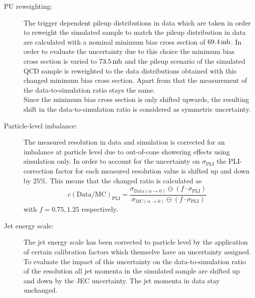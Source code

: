 \begin{description}
 \item[PU reweighting:] The trigger dependent pileup distributions in data which are taken in order to reweight the simulated sample to match the pileup distribution in data are calculated with a nominal minimum bias cross section of $69.4\,\rm{mb}$. In order to evaluate the uncertainty due to this choice the minimum bias cross section is varied to $73.5\,\rm{mb}$ and the pileup scenario of the simulated QCD sample is reweighted to the data distributions obtained with this changed minimum bias cross section. Apart from that the measurement of the data-to-simulation ratio stays the same. \\
 Since the minimum bias cross section is only shifted upwards, the resulting shift in the data-to-simulation ratio is considered as symmetric uncertainty.
 
 \item[Particle-level imbalance:] The measured resolution in data and simulation is corrected for an imbalance at particle level due to out-of-cone showering effects using simulation only. In order to account for the uncertainty on $\sigma_\mathrm{PLI}$ the PLI-correction factor for each measured resolution value is shifted up and down by $25\%$. This means that the changed ratio is calculated as
 \begin{equation}
  c\mathrm{(Data/MC)_{PLI}} = \frac{\sigma_{\mathrm{Data}(\alpha \rightarrow 0)} \ominus (f \cdot \sigma_{\mathrm{PLI}})}{\sigma_{\mathrm{MC}(\alpha \rightarrow 0)} \ominus (f \cdot \sigma_{\mathrm{PLI}})}  
 \end{equation}
with $f=0.75, 1.25$ respectively.
 
 \item[Jet energy scale:] The jet energy scale has been corrected to particle level by the application of certain calibration factors which themselve have an uncertainty assigned. To evaluate the impact of this uncertainty on the data-to-simulation ratio of the resolution all jet momenta in the simulated sample are shifted up and down by the JEC uncertainty. The jet momenta in data stay unchanged.
 

\end{description}
